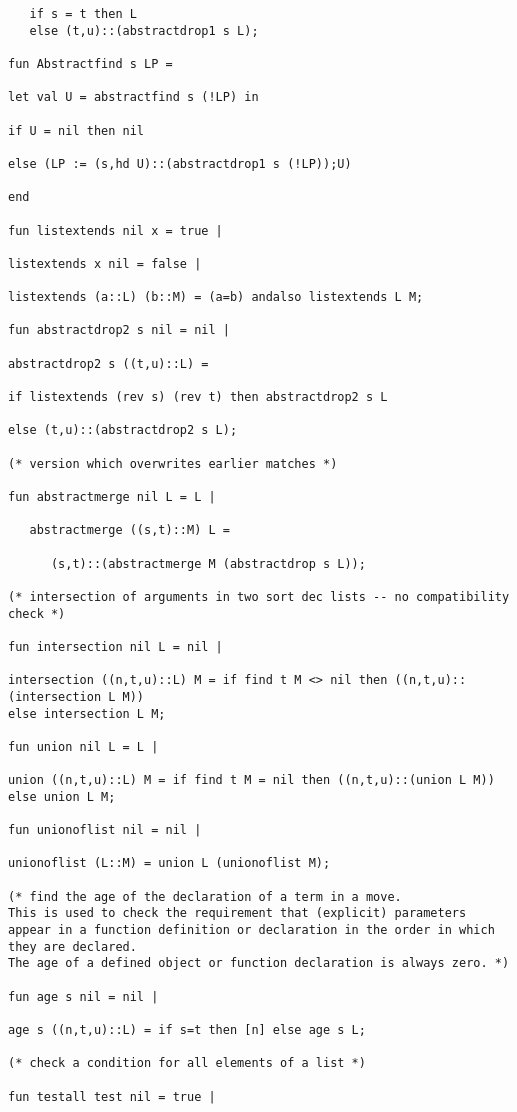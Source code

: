 \documentclass{article}
\begin{document}
\begin{verbatim}
   if s = t then L
   else (t,u)::(abstractdrop1 s L);

fun Abstractfind s LP =

let val U = abstractfind s (!LP) in

if U = nil then nil

else (LP := (s,hd U)::(abstractdrop1 s (!LP));U)

end

fun listextends nil x = true |

listextends x nil = false |

listextends (a::L) (b::M) = (a=b) andalso listextends L M;

fun abstractdrop2 s nil = nil |

abstractdrop2 s ((t,u)::L) =

if listextends (rev s) (rev t) then abstractdrop2 s L

else (t,u)::(abstractdrop2 s L);

(* version which overwrites earlier matches *)

fun abstractmerge nil L = L |

   abstractmerge ((s,t)::M) L =

      (s,t)::(abstractmerge M (abstractdrop s L));

(* intersection of arguments in two sort dec lists -- no compatibility check *)

fun intersection nil L = nil |

intersection ((n,t,u)::L) M = if find t M <> nil then ((n,t,u)::(intersection L M))
else intersection L M;

fun union nil L = L |

union ((n,t,u)::L) M = if find t M = nil then ((n,t,u)::(union L M))
else union L M;

fun unionoflist nil = nil |

unionoflist (L::M) = union L (unionoflist M);

(* find the age of the declaration of a term in a move.  
This is used to check the requirement that (explicit) parameters 
appear in a function definition or declaration in the order in which they are declared.   
The age of a defined object or function declaration is always zero. *)

fun age s nil = nil |

age s ((n,t,u)::L) = if s=t then [n] else age s L;

(* check a condition for all elements of a list *)

fun testall test nil = true |


\end{verbatim}
\end{document}
